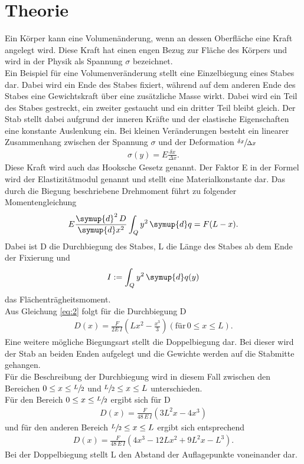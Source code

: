 \section{Theorie}\label{sec:1}\justifying
Ein Körper kann eine Volumenänderung, wenn an dessen Oberfläche eine Kraft angelegt
wird. Diese Kraft hat einen engen Bezug zur Fläche des Körpers und wird in der Physik
als Spannung $\sigma$ bezeichnet.\\
Ein Beispiel für eine Volumenveränderung stellt eine Einzelbiegung eines Stabes dar.
Dabei wird ein Ende des Stabes fixiert, während auf dem anderen Ende des Stabes eine
Gewichtskraft über eine zusätzliche Masse wirkt. Dabei wird ein Teil des Stabes gestreckt,
ein zweiter gestaucht und ein dritter Teil bleibt gleich. Der Stab stellt dabei aufgrund der inneren
Kräfte und der elastische Eigenschaften eine konstante Auslenkung ein.
Bei kleinen Veränderungen
besteht ein linearer Zusammenhang zwischen der Spannung $\sigma$  und der Deformation $\sfrac{\delta x}{\Delta x} $ \cite{V103}
\begin{align}
    \sigma (y)=E \frac{\delta x}{\Delta x} \label{eq:1}.
\end{align}
Diese Kraft wird auch das Hooksche Gesetz genannt. Der Faktor E in der Formel wird
der Elastizitätmodul genannt und stellt eine Materialkonstante dar.
Das durch die Biegung beschriebene Drehmoment führt zu folgender Momentengleichung \cite{V103}
\begin{align}
    E \frac{\symup{d}^2 \, D}{\symup{d}x^2}\int_Q y^2 \, \symup{d}q = F(L-x) .\label{eq:2}
\end{align}
Dabei ist D die Durchbiegung des Stabes, L die Länge des Stabes ab dem Ende der Fixierung und \cite{V103}
\begin{align}
    I := \int_Q y^2 \, \symup{d}q(y) \label{eq:3}
\end{align}
das Flächenträgheitsmoment. \\
Aus Gleichung \eqref{eq:2} folgt für die Durchbiegung D \cite{V103}
\begin{align}
    D(x)=\frac{F}{2E\,I}\left(L  x^2-\frac{x^3}{3}\right) \label{eq:4} (\text{für} \, 0\leq x \leq L).
\end{align}
Eine weitere mögliche Biegungsart stellt die Doppelbiegung dar. Bei dieser wird
der Stab an beiden Enden aufgelegt und die Gewichte werden auf die Stabmitte 
gehangen. \\
Für die Beschreibung der Durchbiegung wird in diesem Fall zwischen den Bereichen
$ 0\leq x\leq \sfrac{L}{2} $ und $\sfrac{L}{2} \leq x \leq L $ unterschieden.\\
Für den Bereich $0\leq x\leq \sfrac{L}{2}$ ergibt sich für D \cite{V103}
\begin{align}
    D(x)=\frac{F}{48\, E\, I}(3L^2x-4x^3) \label{eq:5}
\end{align}
und für den anderen Bereich $\sfrac{L}{2} \leq x \leq L $ ergibt sich entsprechend \cite{V103}
\begin{align}
    D(x)=\frac{F}{48\, E\, I}(4x^3 - 12Lx^2 +9L^2x-L^3) \label{eq:6}.
\end{align}
Bei der Doppelbiegung stellt L den Abstand der Auflagepunkte voneinander dar.


